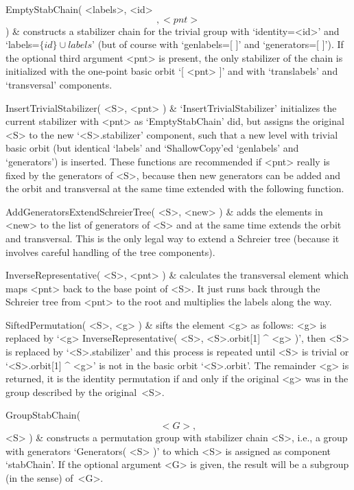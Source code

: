 \function EmptyStabChain( <labels>, <id> \[, <pnt> \] ) &
        constructs  a   stabilizer  chain  for   the trivial   group with
        `identity=<id>' and `labels=$\{id\}\cup  labels$'  (but of course
        with `genlabels=[ ]' and `generators=[ ]'). If the optional third
        argument <pnt>  is present, the only stabilizer   of the chain is
        initialized with the  one-point basic orbit  `[ <pnt> ]' and with
        `translabels' and `transversal' components.
        
\function InsertTrivialStabilizer( <S>, <pnt> ) &
        `InsertTrivialStabilizer' initializes the current stabilizer with
        <pnt>  as `EmptyStabChain' did,  but  assigns the original <S> to
        the  new `<S>.stabilizer' component,  such that  a new level with
        trivial basic  orbit (but identical  `labels' and `ShallowCopy'ed
        `genlabels' and  `generators') is  inserted. These functions  are
        recommended if <pnt> really is  fixed  by the generators of  <S>,
        because   then new generators  can   be added and  the  orbit and
        transversal   at the  same   time  extended  with  the  following
        function.

\function AddGeneratorsExtendSchreierTree( <S>, <new> ) &
        adds the elements  in <new> to the list  of generators of <S> and
        at the  same time extends the  orbit and transversal. This is the
        only legal way  to extend  a  Schreier tree (because  it involves
        careful handling of the tree components).

\function InverseRepresentative( <S>, <pnt> ) &
        calculates the transversal element which  maps <pnt> back to  the
        base point of  <S>. It just  runs back through the  Schreier tree
        from <pnt> to the root and multiplies the labels along the way.

\function SiftedPermutation( <S>, <g> ) &
        sifts  the element  <g> as  follows: <g>  is replaced by  `<g> \*
        InverseRepresentative(  <S>, <S>.orbit[1] ^   <g> )', then <S> is
        replaced by `<S>.stabilizer' and  this process is repeated  until
        <S> is trivial or `<S>.orbit[1] ^ <g>' is  not in the basic orbit
        `<S>.orbit'.  The remainder <g>  is returned, it  is the identity
        permutation if  and  only if the  original <g>  was in  the group
        described by the original~<S>.

\function GroupStabChain( \[ <G>, \] <S> ) &
        constructs a permutation group with stabilizer chain <S>, i.e., a
        group    with  generators `Generators( <S>  )'   to  which <S> is
        assigned as component  `stabChain'. If the  optional argument <G>
        is  given, the result  will be  a subgroup (in  the {\GAP} sense)
        of~<G>.
\enditems

